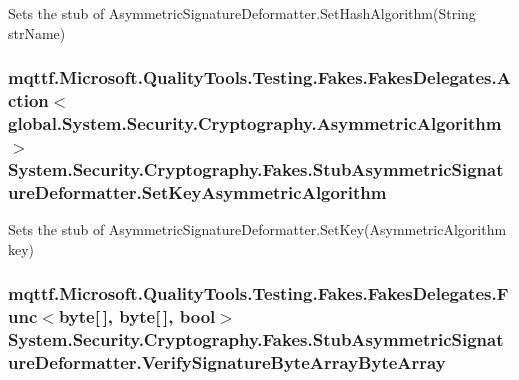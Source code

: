 Sets the stub of Asymmetric\-Signature\-Deformatter.\-Set\-Hash\-Algorithm(\-String str\-Name)

\hypertarget{class_system_1_1_security_1_1_cryptography_1_1_fakes_1_1_stub_asymmetric_signature_deformatter_af28c35799234bb8f92a741c8d519a4e9}{
\subsubsection[{Set\-Key\-Asymmetric\-Algorithm}]{\setlength{\rightskip}{0pt plus 5cm}mqttf.\-Microsoft.\-Quality\-Tools.\-Testing.\-Fakes.\-Fakes\-Delegates.\-Action$<$global.\-System.\-Security.\-Cryptography.\-Asymmetric\-Algorithm$>$ System.\-Security.\-Cryptography.\-Fakes.\-Stub\-Asymmetric\-Signature\-Deformatter.\-Set\-Key\-Asymmetric\-Algorithm}}\label{class_system_1_1_security_1_1_cryptography_1_1_fakes_1_1_stub_asymmetric_signature_deformatter_af28c35799234bb8f92a741c8d519a4e9}


Sets the stub of Asymmetric\-Signature\-Deformatter.\-Set\-Key(\-Asymmetric\-Algorithm key)

\hypertarget{class_system_1_1_security_1_1_cryptography_1_1_fakes_1_1_stub_asymmetric_signature_deformatter_a89c955e67d65dc4b888b41633168e417}{
\subsubsection[{Verify\-Signature\-Byte\-Array\-Byte\-Array}]{\setlength{\rightskip}{0pt plus 5cm}mqttf.\-Microsoft.\-Quality\-Tools.\-Testing.\-Fakes.\-Fakes\-Delegates.\-Func$<$byte\mbox{[}$\,$\mbox{]}, byte\mbox{[}$\,$\mbox{]}, bool$>$ System.\-Security.\-Cryptography.\-Fakes.\-Stub\-Asymmetric\-Signature\-Deformatter.\-Verify\-Signature\-Byte\-Array\-Byte\-Array}}\label{class_system_1_1_security_1_1_cryptography_1_1_fakes_1_1_stub_asymmetric_signature_deformatter_a89c955e67d65dc4b888b41633168e417}


